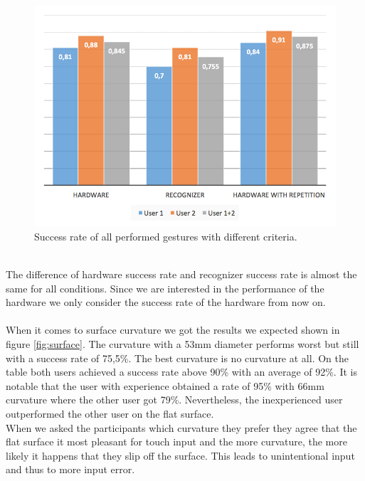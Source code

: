 \begin{figure}
\includegraphics[scale=0.35]{images/overallRecognition.jpg}
\caption{Success rate of all performed gestures with different criteria.}
\label{fig:overallRecognition}
\end{figure}
\\
The difference of hardware success rate and recognizer success rate is almost the same for all conditions. Since we are interested in the performance of the hardware we only consider the success rate of the hardware from now on. 
\\ \\
When it comes to surface curvature we got the results we expected shown in figure \ref{fig:surface}. The curvature with a 53mm diameter performs worst but still with a success rate of 75,5\%. The best curvature is no curvature at all. On the table both users achieved a success rate above 90\% with an average of 92\%. It is notable that the user with experience obtained a rate of 95\% with 66mm curvature where the other user got 79\%. Nevertheless, the inexperienced user outperformed the other user on the flat surface. 
\\
When we asked the participants which curvature they prefer they agree that the flat surface it most pleasant for touch input and the more curvature, the more likely it happens that they slip off the surface. This leads to unintentional input and thus to more input error. 
